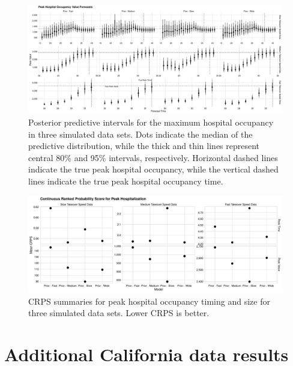 \begin{figure}
    \centering
    \includegraphics[width=1.0\columnwidth]{sensitivity_simulated_peak_assessment_value_plot}
    \caption[Posterior predictive intervals for peak hospital occupancy for simulated data sets.]{Posterior predictive intervals for the maximum hospital occupancy in three simulated data sets.
    Dots indicate the median of the predictive distribution, while the thick and thin lines represent central 80\% and 95\% intervals, respectively.
    Horizontal dashed lines indicate the true peak hospital occupancy, while the vertical dashed lines indicate the true peak hospital occupancy time.}
    \label{ch_5:fig:sensitivity_simulated_peak_assessment_value_plot}
\end{figure}

\begin{figure}
    \centering
    \includegraphics[width=1.0\columnwidth]{sensitivity_simulated_peak_crps_dotplot_plot}
    \caption[CRPS summaries for peak hospital occupancy in simulated data sets.]{CRPS summaries for peak hospital occupancy timing and size for three simulated data sets. Lower CRPS is better.}
    \label{ch_5:fig:sensitivity_simulated_peak_crps_dotplot_plot}
\end{figure}

\section{Additional California data results}

